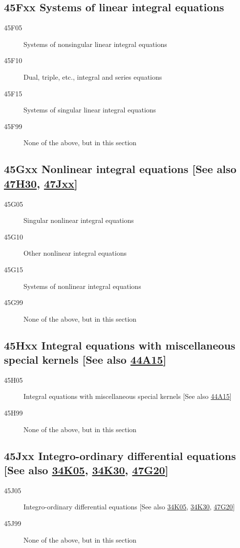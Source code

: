 \subsection*{45Fxx  Systems of linear integral equations }\label{45Fxx}
\begin{description}  
\item [45F05]\label{45F05} Systems of nonsingular linear integral equations
\item [45F10]\label{45F10} Dual, triple, etc., integral and series equations
\item [45F15]\label{45F15} Systems of singular linear integral equations
\item [45F99]\label{45F99} None of the above, but in this section
\end{description}
\subsection*{45Gxx  Nonlinear integral equations [See also \hyperref[47H30]{47H30}, \hyperref[47Jxx]{47Jxx}] }\label{45Gxx}
\begin{description}  
\item [45G05]\label{45G05} Singular nonlinear integral equations
\item [45G10]\label{45G10} Other nonlinear integral equations
\item [45G15]\label{45G15} Systems of nonlinear integral equations
\item [45G99]\label{45G99} None of the above, but in this section
\end{description}
\subsection*{45Hxx  Integral equations with miscellaneous special kernels [See also \hyperref[44A15]{44A15}] }\label{45Hxx}
\begin{description}  
\item [45H05]\label{45H05} Integral equations with miscellaneous special kernels [See also \hyperref[44A15]{44A15}]
\item [45H99]\label{45H99} None of the above, but in this section
\end{description}
\subsection*{45Jxx  Integro-ordinary differential equations [See also \hyperref[34K05]{34K05}, \hyperref[34K30]{34K30}, \hyperref[47G20]{47G20}] }\label{45Jxx}
\begin{description}  
\item [45J05]\label{45J05} Integro-ordinary differential equations [See also \hyperref[34K05]{34K05}, \hyperref[34K30]{34K30}, \hyperref[47G20]{47G20}]
\item [45J99]\label{45J99} None of the above, but in this section
\end{description}
